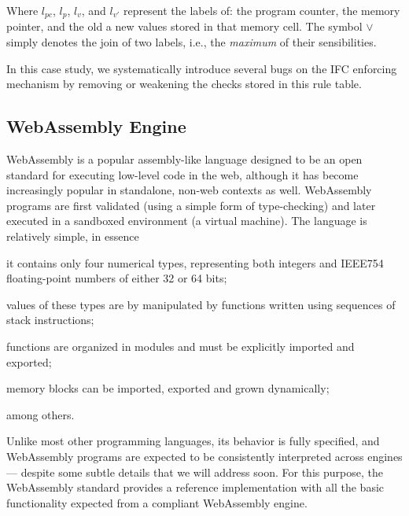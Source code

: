 \documentclass[sigconf, anonymous]{acmart}
\begin{document}
Where $l_{pc}$, $l_{p}$, $l_{v}$, and $l_{v'}$ represent the labels of: the
program counter, the memory pointer, and the old a new values stored in that
memory cell.
%
The symbol $\vee$ simply denotes the join of two labels, i.e., the
\emph{maximum} of their sensibilities.

In this case study, we systematically introduce several bugs on the IFC
enforcing mechanism by removing or weakening the checks stored in this rule
table.

\subsection{WebAssembly Engine}

WebAssembly \cite{haas2017bringing} is a popular assembly-like language designed
to be an open standard for executing low-level code in the web, although it has
become increasingly popular in standalone, non-web contexts as well.
%
WebAssembly programs are first validated (using a simple form of type-checking)
and later executed in a sandboxed environment (a virtual machine).
%
%
The language is relatively simple, in essence
%
\begin{inparaenum}
  \item it contains only four numerical types, representing both integers and
    IEEE754 floating-point numbers of either 32 or 64 bits;
  \item values of these types are by manipulated by functions written using
    sequences of stack instructions;
  \item functions are organized in modules and must be explicitly imported and
    exported;
  \item memory blocks can be imported, exported and grown dynamically;
\end{inparaenum}
%
among others.
%


Unlike most other programming languages, its behavior is fully specified, and
WebAssembly programs are expected to be consistently interpreted across engines
--- despite some subtle details that we will address soon.
%
For this purpose, the WebAssembly standard provides a reference implementation
with all the basic functionality expected from a compliant WebAssembly engine.
\end{document}
